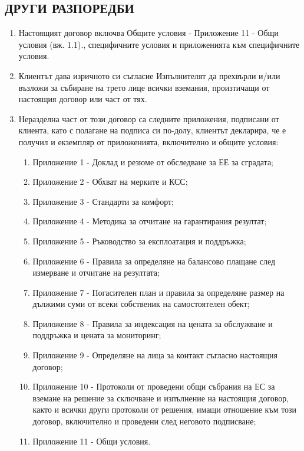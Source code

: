 \subsection{ДРУГИ РАЗПОРЕДБИ}
\begin{enumerate}
\item Настоящият договор включва Общите условия {-} Приложение 11 {-} Общи
  условия (вж. 1.1)., специфичните условия и приложенията към
  специфичните условия.
\item Клиентът дава изричното си съгласие Изпълнителят да прехвърли
  и/или възложи за събиране на трето лице всички вземания, произтичащи
  от настоящия договор или част от тях.
\item Неразделна част от този договор са следните приложения,
  подписани от клиента, като с полагане на подписа си по-долу,
  клиентът декларира, че е получил и екземпляр от приложенията,
  включително и общите условия:
  \begin{enumerate}
  \item Приложение 1 {-} Доклад и резюме от обследване за ЕЕ за сградата;
  \item Приложение 2 {-} Обхват на мерките и КСС;
  \item Приложение 3 {-} Стандарти за комфорт;
  \item Приложение 4 {-} Методика за отчитане на гарантирания резултат;
  \item Приложение 5 {-} Ръководство за експлоатация и поддръжка;
  \item Приложение 6 {-} Правила за определяне на балансово плащане след
    измерване и отчитане на резултата;
  \item Приложение 7 {-} Погасителен план и правила за определяне размер
    на дължими суми от всеки собственик на самостоятелен обект;
  \item Приложение 8 {-} Правила за индексация на цената за обслужване и
    поддръжка и цената за мониторинг;
  \item Приложение 9 {-} Определяне на лица за контакт съгласно
    настоящия договор;
  \item Приложение 10 {-} Протоколи от проведени общи събрания на ЕС за
    вземане на решение за сключване и изпълнение на настоящия договор,
    както и всички други протоколи от решения, имащи отношение към
    този договор, включително и проведени след неговото подписване;
  \item Приложение 11 {-} Общи условия.
  \end{enumerate}
\end{enumerate}

